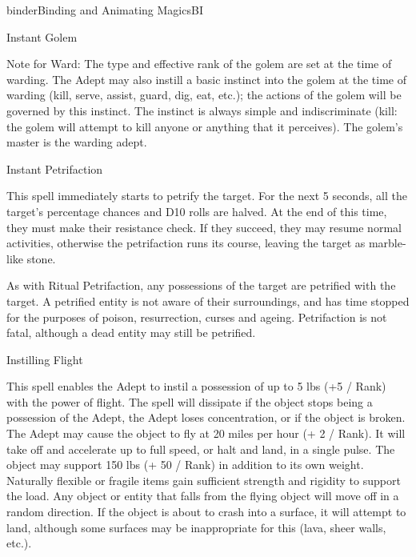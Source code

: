 \begin{college}[1.1]{binder}{Binding and Animating Magics}{BI}
\begin{spell}[S-4]{Instant Golem}
\begin{effects}
Note for Ward: The type and effective rank of the golem are set at the
time of warding.  The Adept may also instill a basic instinct into the
golem at the time of warding (\eg kill, serve, assist, guard, dig,
eat, etc.); the actions of the golem will be governed by this
instinct.  The instinct is always simple and indiscriminate (\eg kill:
the golem will attempt to kill anyone or anything that it perceives).
The golem's master is the warding adept.

\end{effects}
\end{spell}

\begin{spell}[S-5]{Instant Petrifaction}

\begin{effects}
This spell immediately starts to petrify the target. For the next 5
seconds, all the target's percentage chances and D10 rolls are
halved. At the end of this time, they must make their resistance
check. If they succeed, they may resume normal activities, otherwise
the petrifaction runs its course, leaving the target as marble-like
stone.

As with Ritual Petrifaction, any possessions of the target are
petrified with the target. A petrified entity is not aware of their
surroundings, and has time stopped for the purposes of poison,
resurrection, curses and ageing. Petrifaction is not fatal, although a
dead entity may still be petrified.

\end{effects}
\end{spell}

\begin{spell}[S-6]{Instilling Flight}

\begin{effects}
This spell enables the Adept to instil a possession of up to 5 lbs (+5
/ Rank) with the power of flight. The spell will dissipate if the
object stops being a possession of the Adept, the Adept loses
concentration, or if the object is broken. The Adept may cause the
object to fly at 20 miles per hour (+ 2 / Rank). It will take off and
accelerate up to full speed, or halt and land, in a single pulse. The
object may support 150 lbs (+ 50 / Rank) in addition to its own
weight. Naturally flexible or fragile items gain sufficient strength
and rigidity to support the load. Any object or entity that falls from
the flying object will move off in a random direction. If the object
is about to crash into a surface, it will attempt to land, although
some surfaces may be inappropriate for this (lava, sheer walls, etc.).
\end{effects}
\end{spell}


\end{college}
